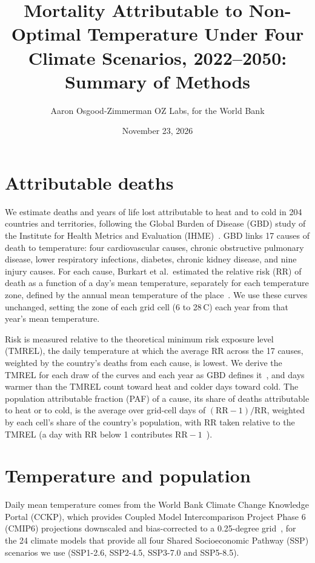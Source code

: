 \documentclass[11pt]{ozreport}
\title{Mortality Attributable to Non-Optimal Temperature Under Four Climate Scenarios, 2022--2050: Summary of Methods}
\author{Aaron Osgood-Zimmerman \quad\textperiodcentered\quad OZ Labs, for the World Bank}
\date{November 23, 2026}
\begin{document}
\maketitle

\section{Attributable deaths}

We estimate deaths and years of life lost attributable to heat and to cold in 204 countries and territories, following the Global Burden of Disease (GBD) study of the Institute for Health Metrics and Evaluation (IHME)~\cite{burkart2021,gbd2021rf}. GBD links 17 causes of death to temperature: four cardiovascular causes, chronic obstructive pulmonary disease, lower respiratory infections, diabetes, chronic kidney disease, and nine injury causes. For each cause, Burkart et al.\ estimated the relative risk (RR) of death as a function of a day's mean temperature, separately for each temperature zone, defined by the annual mean temperature of the place~\cite{burkart2021}. We use these curves unchanged, setting the zone of each grid cell (6 to 28\,\textdegree C) each year from that year's mean temperature.

Risk is measured relative to the theoretical minimum risk exposure level (TMREL), the daily temperature at which the average RR across the 17 causes, weighted by the country's deaths from each cause, is lowest. We derive the TMREL for each draw of the curves and each year as GBD defines it~\cite{burkart2021}, and days warmer than the TMREL count toward heat and colder days toward cold. The population attributable fraction (PAF) of a cause, its share of deaths attributable to heat or to cold, is the average over grid-cell days of $(\mathrm{RR}-1)/\mathrm{RR}$, weighted by each cell's share of the country's population, with RR taken relative to the TMREL (a day with RR below 1 contributes $\mathrm{RR}-1$~\cite{burkart2021}).

\section{Temperature and population}

Daily mean temperature comes from the World Bank Climate Change Knowledge Portal (CCKP), which provides Coupled Model Intercomparison Project Phase 6 (CMIP6) projections downscaled and bias-corrected to a 0.25-degree grid~\cite{cckp}, for the 24 climate models that provide all four Shared Socioeconomic Pathway (SSP) scenarios we use (SSP1-2.6, SSP2-4.5, SSP3-7.0 and SSP5-8.5).
\end{document}
